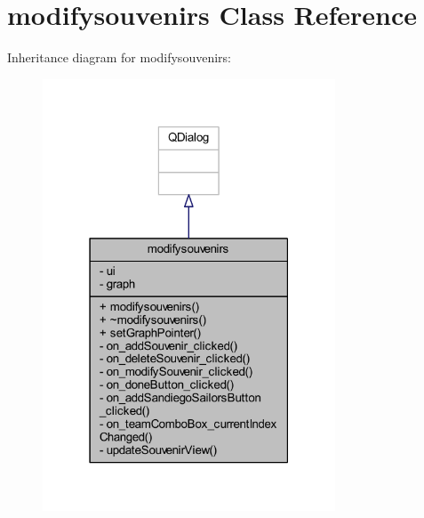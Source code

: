 \hypertarget{classmodifysouvenirs}{}\section{modifysouvenirs Class Reference}
\label{classmodifysouvenirs}


Inheritance diagram for modifysouvenirs\+:\nopagebreak
\begin{figure}[H]
\begin{center}
\leavevmode
\includegraphics[width=247pt]{classmodifysouvenirs__inherit__graph}
\end{center}
\end{figure}


